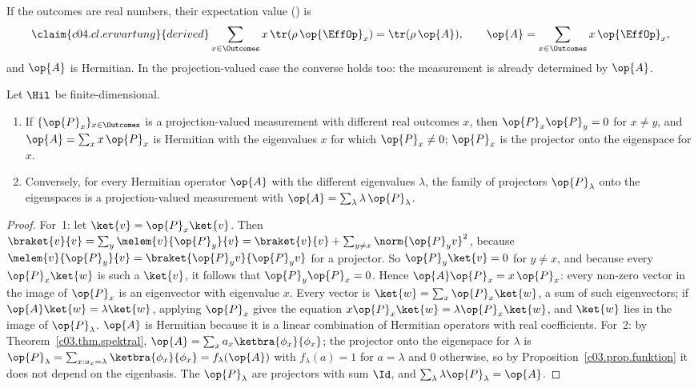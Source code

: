 If the outcomes are real numbers, their expectation value () is
\begin{equation}\label{c04.eq.erwartung}\claim{c04.cl.erwartung}{derived}
  \sum_{x \in \Outcomes} x\, \tr(\rho\,\op{\EffOp}_x) = \tr(\rho\, \op{A}) ,
  \qquad
  \op{A} = \sum_{x \in \Outcomes} x\, \op{\EffOp}_x ,
\end{equation}
and $\op{A}$ is Hermitian. In the projection-valued case the converse holds too: the measurement
is already determined by $\op{A}$.

\begin{proposition}\label{c04.prop.pvm}
  Let $\Hil$ be finite-dimensional.
  \begin{enumerate}
    \item If $\{\op{P}_x\}_{x \in \Outcomes}$ is a projection-valued measurement with different
      real outcomes $x$, then $\op{P}_x\op{P}_y = 0$ for $x \neq y$, and $\op{A} = \sum_x x\,\op{P}_x$
      is Hermitian with the eigenvalues $x$ for which $\op{P}_x \neq 0$; $\op{P}_x$ is the
      projector onto the eigenspace for $x$.
    \item Conversely, for every Hermitian operator $\op{A}$ with the different eigenvalues
      $\lambda$, the family of projectors $\op{P}_\lambda$ onto the eigenspaces is a
      projection-valued measurement with $\op{A} = \sum_\lambda \lambda\,\op{P}_\lambda$.
  \end{enumerate}
\end{proposition}
\begin{proof}
  For~1: let $\ket{v} = \op{P}_x\ket{v}$. Then
  $\braket{v}{v} = \sum_y \melem{v}{\op{P}_y}{v} = \braket{v}{v} + \sum_{y \neq x} \norm{\op{P}_y v}^2$,
  because $\melem{v}{\op{P}_y}{v} = \braket{\op{P}_y v}{\op{P}_y v}$ for a projector. So
  $\op{P}_y\ket{v} = 0$ for $y \neq x$, and because every $\op{P}_x\ket{w}$ is such a $\ket{v}$,
  it follows that $\op{P}_y\op{P}_x = 0$. Hence $\op{A}\op{P}_x = x\,\op{P}_x$: every non-zero
  vector in the image of $\op{P}_x$ is an eigenvector with eigenvalue $x$. Every vector is
  $\ket{w} = \sum_x \op{P}_x\ket{w}$, a sum of such eigenvectors; if $\op{A}\ket{w} = \lambda\ket{w}$,
  applying $\op{P}_x$ gives the equation $x\op{P}_x\ket{w} = \lambda\op{P}_x\ket{w}$, and
  $\ket{w}$ lies in the image of $\op{P}_\lambda$. $\op{A}$ is Hermitian because it is a linear
  combination of Hermitian operators with real coefficients. For~2: by Theorem~\ref{c03.thm.spektral},
  $\op{A} = \sum_x a_x\ketbra{\phi_x}{\phi_x}$; the projector onto the eigenspace for $\lambda$ is
  $\op{P}_\lambda = \sum_{x: a_x = \lambda} \ketbra{\phi_x}{\phi_x} = f_\lambda(\op{A})$ with
  $f_\lambda(a) = 1$ for $a = \lambda$ and $0$ otherwise, so by
  Proposition~\ref{c03.prop.funktion} it does not depend on the eigenbasis. The $\op{P}_\lambda$ are
  projectors with sum $\Id$, and $\sum_\lambda \lambda\op{P}_\lambda = \op{A}$.
\end{proof}

